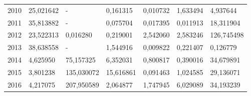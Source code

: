 \begin{table}
\begin{tabular}{p{1cm}p{2cm}p{2cm}p{2cm}p{2cm}p{2cm}p{2cm}}
 2010 &        25,021642 &                                - &                                      0,161315 &                                0,010732 &      1,633494 &                                  4,937644 \\
 2011 &        35,813882 &                                - &                                      0,075704 &                                0,017395 &      0,011913 &                                 18,311904 \\
 2012 &        23,522313 &                         0,016280 &                                      0,219001 &                                2,542060 &      2,583246 &                                126,745498 \\
 2013 &        38,638558 &                                - &                                      1,544916 &                                0,009822 &      0,221407 &                                  0,126779 \\
 2014 &         4,625950 &                        75,157325 &                                      6,352031 &                                0,800817 &      0,390016 &                                 34,679891 \\
 2015 &         3,801238 &                       135,030072 &                                     15,616861 &                                0,091463 &      1,024585 &                                 29,136071 \\
 2016 &         4,217075 &                       207,950589 &                                      2,064877 &                                1,747945 &      6,029089 &                                 34,193239 \\
\bottomrule
\end{tabular}
\end{table}
